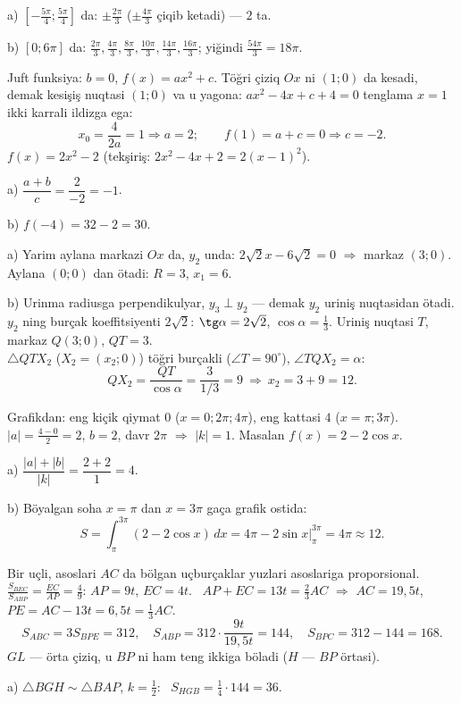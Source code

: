 a) $\left[-\frac{5\pi}4;\frac{5\pi}4\right]$ da: $\pm\frac{2\pi}3$ ($\pm\frac{4\pi}3$ çiqib ketadi) — $2$ ta.

b) $[0;6\pi]$ da: $\frac{2\pi}3,\frac{4\pi}3,\frac{8\pi}3,\frac{10\pi}3,\frac{14\pi}3,\frac{16\pi}3$; yiğindi $\frac{54\pi}3=18\pi$.

\newpage
{}
Juft funksiya: $b=0$, $f(x)=ax^2+c$. Töğri çiziq $Ox$ ni $(1;0)$ da kesadi, demak kesişiş nuqtasi $(1;0)$ va u yagona: $ax^2-4x+c+4=0$ tenglama $x=1$ ikki karrali ildizga ega:
\[x_0=\frac4{2a}=1\Rightarrow a=2;\qquad f(1)=a+c=0\Rightarrow c=-2.\]
$f(x)=2x^2-2$ (tekşiriş: $2x^2-4x+2=2(x-1)^2$).

a) $\dfrac{a+b}c=\dfrac{2}{-2}=-1$.

b) $f(-4)=32-2=30$.

\newpage
{}
a) Yarim aylana markazi $Ox$ da, $y_2$ unda: $2\sqrt2x-6\sqrt2=0$ $\Rightarrow$ markaz $(3;0)$. Aylana $(0;0)$ dan ötadi: $R=3$, $x_1=6$.

b) Urinma radiusga perpendikulyar, $y_3\perp y_2$ — demak $y_2$ uriniş nuqtasidan ötadi. $y_2$ ning burçak koeffitsiyenti $2\sqrt2$: $\tg\alpha=2\sqrt2$, $\cos\alpha=\frac13$. Uriniş nuqtasi $T$, markaz $Q(3;0)$, $QT=3$.\\
$\triangle QTX_2$ ($X_2=(x_2;0)$) töğri burçakli ($\angle T=90^\circ$), $\angle TQX_2=\alpha$:
\[QX_2=\frac{QT}{\cos\alpha}=\frac3{1/3}=9\ \Rightarrow\ x_2=3+9=12.\]

\newpage
{}
Grafikdan: eng kiçik qiymat $0$ ($x=0;2\pi;4\pi$), eng kattasi $4$ ($x=\pi;3\pi$). $|a|=\frac{4-0}2=2$, $b=2$, davr $2\pi$ $\Rightarrow$ $|k|=1$. Masalan $f(x)=2-2\cos x$.

a) $\dfrac{|a|+|b|}{|k|}=\dfrac{2+2}1=4$.

b) Böyalgan soha $x=\pi$ dan $x=3\pi$ gaça grafik ostida:
\[S=\int_\pi^{3\pi}(2-2\cos x)\,dx=4\pi-2\sin x\Big|_\pi^{3\pi}=4\pi\approx12.\]

\newpage
{}
Bir uçli, asoslari $AC$ da bölgan uçburçaklar yuzlari asoslariga proporsional.\\
$\frac{S_{BEC}}{S_{ABP}}=\frac{EC}{AP}=\frac49$: $AP=9t$, $EC=4t$. \ $AP+EC=13t=\frac23AC$ $\Rightarrow$ $AC=19{,}5t$, $PE=AC-13t=6{,}5t=\frac13AC$.
\[S_{ABC}=3S_{BPE}=312,\quad S_{ABP}=312\cdot\frac{9t}{19{,}5t}=144,\quad S_{BPC}=312-144=168.\]
$GL$ — örta çiziq, u $BP$ ni ham teng ikkiga böladi ($H$ — $BP$ örtasi).

a) $\triangle BGH\sim\triangle BAP$, $k=\frac12$: \ $S_{HGB}=\frac14\cdot144=36$.

